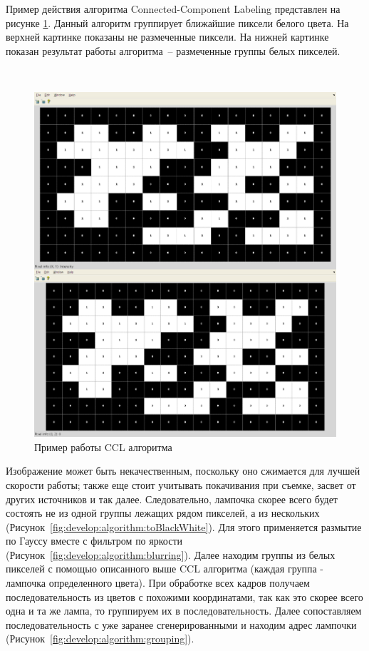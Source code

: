 Пример действия алгоритма Connected-Component Labeling представлен на рисунке \ref{fig:develop:algorithm:ccl_example}. Данный алгоритм группирует ближайшие пиксели белого цвета. На верхней картинке показаны не размеченные пиксели. На нижней картинке показан результат работы алгоритма~-- размеченные группы белых пикселей.

~
\begin{figure}[H]
\centering
	\includegraphics[scale=0.3]{figures/calibration/ccl_example.png}
	\caption{Пример работы CCL алгоритма}
	\label{fig:develop:algorithm:ccl_example}
\end{figure}

Изображение может быть некачественным, поскольку оно сжимается для лучшей скорости работы; также еще стоит учитывать покачивания при съемке, засвет от других источников и так далее. Следовательно, лампочка скорее всего будет состоять не из одной группы лежащих рядом пикселей, а из нескольких (Рисунок~\ref{fig:develop:algorithm:toBlackWhite}). Для этого применяется размытие по Гауссу вместе с фильтром по яркости (Рисунок~\ref{fig:develop:algorithm:blurring}). Далее находим группы из белых пикселей с помощью описанного выше CCL алгоритма (каждая группа - лампочка определенного цвета). При обработке всех кадров получаем последовательность из цветов с похожими координатами, так как это скорее всего одна и та же лампа, то группируем их в последовательность. Далее сопоставляем последовательность с уже заранее сгенерированными и находим адрес лампочки (Рисунок~\ref{fig:develop:algorithm:grouping}).

